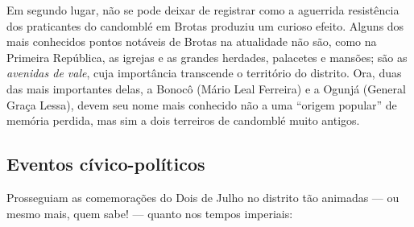 Em segundo lugar, não se pode deixar de registrar como a aguerrida resistência dos praticantes do candomblé em Brotas produziu um curioso efeito. Alguns dos mais conhecidos pontos notáveis de Brotas na atualidade não são, como na Primeira República, as igrejas e as grandes herdades, palacetes e mansões; são as \textit{avenidas de vale}, cuja importância transcende o território do distrito. Ora, duas das mais importantes delas, a Bonocô (Mário Leal Ferreira) e a Ogunjá (General Graça Lessa), devem seu nome mais conhecido não a uma ``origem popular'' de memória perdida, mas sim a dois terreiros de candomblé muito antigos. 

\subsection{Eventos cívico-políticos}

Prosseguiam as comemorações do Dois de Julho no distrito tão animadas --- ou mesmo mais, quem sabe! --- quanto nos tempos imperiais:

